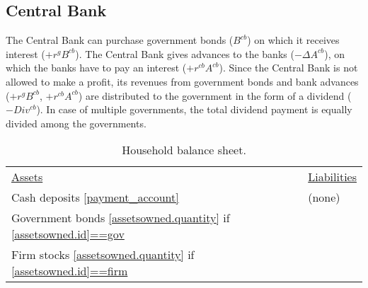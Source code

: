 \subsection{Central Bank}
The Central Bank can purchase government bonds ($B^{cb}$) on which it receives interest ($+r^{g}B^{cb}$).
The Central Bank gives advances to the banks ($-\Delta A^{cb}$), on which the banks have to pay an interest ($+r^{cb}A^{cb}$). Since the Central Bank is not allowed to make a profit, its revenues from government bonds and bank advances ($+r^{g}B^{cb}$, $+r^{cb}A^{cb}$) are distributed to the government in the form of a dividend ($-Div^{cb}$). In case of multiple governments, the total dividend payment is equally divided among the governments.

\clearpage
\begin{table}[H!]
\caption{Household balance sheet.}
\label{Table: Household balance sheet}\centering
\begin{tabular}{ll}
\underline{Assets} & \underline{Liabilities} \\
Cash deposits \url{[payment_account]} & (none)\\
Government bonds \url{[assetsowned.quantity]} if \url{[assetsowned.id]==gov} &\\
Firm stocks \url{[assetsowned.quantity]}  if \url{[assetsowned.id]==firm}  &\\
\end{tabular}%
\end{table}

